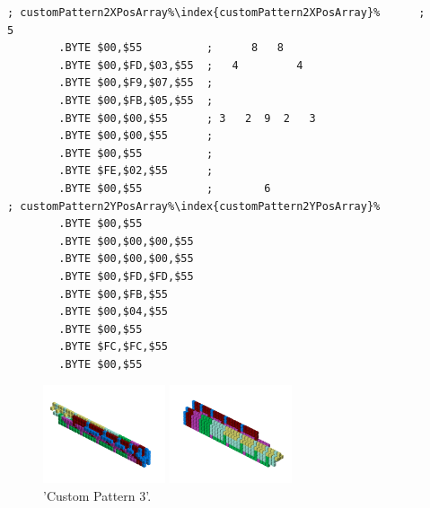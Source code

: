 \begin{minipage}[b]{0.48\linewidth}
\begin{lrbox}{\mybox}%
\begin{lstlisting}[basicstyle=\ttfamily\tiny,escapechar=\%]
; customPattern2XPosArray%\index{customPattern2XPosArray}%      ;        5       
        .BYTE $00,$55          ;      8   8     
        .BYTE $00,$FD,$03,$55  ;   4         4  
        .BYTE $00,$F9,$07,$55  ;                
        .BYTE $00,$FB,$05,$55  ;                
        .BYTE $00,$00,$55      ; 3   2  9  2   3
        .BYTE $00,$00,$55      ;                
        .BYTE $00,$55          ;                
        .BYTE $FE,$02,$55      ;                
        .BYTE $00,$55          ;        6       
; customPattern2YPosArray%\index{customPattern2YPosArray}%
        .BYTE $00,$55
        .BYTE $00,$00,$00,$55
        .BYTE $00,$00,$00,$55
        .BYTE $00,$FD,$FD,$55
        .BYTE $00,$FB,$55
        .BYTE $00,$04,$55
        .BYTE $00,$55
        .BYTE $FC,$FC,$55
        .BYTE $00,$55
\end{lstlisting}
\end{lrbox}%
\scalebox{0.8}{\usebox{\mybox}}

\end{minipage}
\begin{minipage}[b]{0.50\linewidth}
\begin{figure}[H]
    \centering
    \begin{adjustbox}{width=6cm,margin=0cm 0cm}
      \includegraphics[width=3.6cm]{src/patterns/pattern11-45.png}%
    \end{adjustbox}
    \begin{adjustbox}{width=6cm,margin=0cm -1.8cm}
      \includegraphics[width=3.6cm]{src/patterns/pattern11-225.png}%
    \end{adjustbox}
\caption{'Custom Pattern 3'.}
\end{figure}
\end{minipage}
